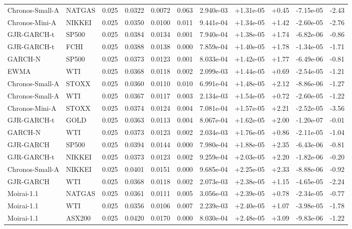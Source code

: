 \begin{tabular}{llrrrrrrrrr}
Chronos-Small-A & NATGAS & 0.025 & 0.0322 & 0.0072 & 0.063 & 2.940e-03 & +1.31e-05 & +0.45 & -7.15e-05 & -2.43 \\
Chronos-Mini-A & NIKKEI & 0.025 & 0.0350 & 0.0100 & 0.011 & 9.441e-04 & +1.34e-05 & +1.42 & -2.60e-05 & -2.76 \\
GJR-GARCH-t & SP500 & 0.025 & 0.0384 & 0.0134 & 0.001 & 7.940e-04 & +1.38e-05 & +1.74 & -6.82e-06 & -0.86 \\
GJR-GARCH-t & FCHI & 0.025 & 0.0388 & 0.0138 & 0.000 & 7.859e-04 & +1.40e-05 & +1.78 & -1.34e-05 & -1.71 \\
GARCH-N & SP500 & 0.025 & 0.0373 & 0.0123 & 0.001 & 8.033e-04 & +1.42e-05 & +1.77 & -6.49e-06 & -0.81 \\
EWMA & WTI & 0.025 & 0.0368 & 0.0118 & 0.002 & 2.099e-03 & +1.44e-05 & +0.69 & -2.54e-05 & -1.21 \\
Chronos-Small-A & STOXX & 0.025 & 0.0360 & 0.0110 & 0.010 & 6.991e-04 & +1.48e-05 & +2.12 & -8.86e-06 & -1.27 \\
Chronos-Small-A & WTI & 0.025 & 0.0367 & 0.0117 & 0.003 & 2.134e-03 & +1.54e-05 & +0.72 & -2.60e-05 & -1.22 \\
Chronos-Mini-A & STOXX & 0.025 & 0.0374 & 0.0124 & 0.004 & 7.081e-04 & +1.57e-05 & +2.21 & -2.52e-05 & -3.56 \\
GJR-GARCH-t & GOLD & 0.025 & 0.0363 & 0.0113 & 0.004 & 8.067e-04 & +1.62e-05 & +2.00 & -1.20e-07 & -0.01 \\
GARCH-N & WTI & 0.025 & 0.0373 & 0.0123 & 0.002 & 2.034e-03 & +1.76e-05 & +0.86 & -2.11e-05 & -1.04 \\
GJR-GARCH & SP500 & 0.025 & 0.0394 & 0.0144 & 0.000 & 7.980e-04 & +1.88e-05 & +2.35 & -6.43e-06 & -0.81 \\
GJR-GARCH-t & NIKKEI & 0.025 & 0.0373 & 0.0123 & 0.002 & 9.259e-04 & +2.03e-05 & +2.20 & -1.82e-06 & -0.20 \\
Chronos-Small-A & NIKKEI & 0.025 & 0.0401 & 0.0151 & 0.000 & 9.685e-04 & +2.25e-05 & +2.33 & -8.88e-06 & -0.92 \\
GJR-GARCH & WTI & 0.025 & 0.0368 & 0.0118 & 0.002 & 2.073e-03 & +2.38e-05 & +1.15 & -4.65e-05 & -2.24 \\
Moirai-1.1 & NATGAS & 0.025 & 0.0361 & 0.0111 & 0.005 & 3.056e-03 & +2.39e-05 & +0.78 & -2.34e-05 & -0.77 \\
Moirai-1.1 & WTI & 0.025 & 0.0356 & 0.0106 & 0.007 & 2.239e-03 & +2.40e-05 & +1.07 & -3.98e-05 & -1.78 \\
Moirai-1.1 & ASX200 & 0.025 & 0.0420 & 0.0170 & 0.000 & 8.030e-04 & +2.48e-05 & +3.09 & -9.83e-06 & -1.22 \\

\end{tabular}
